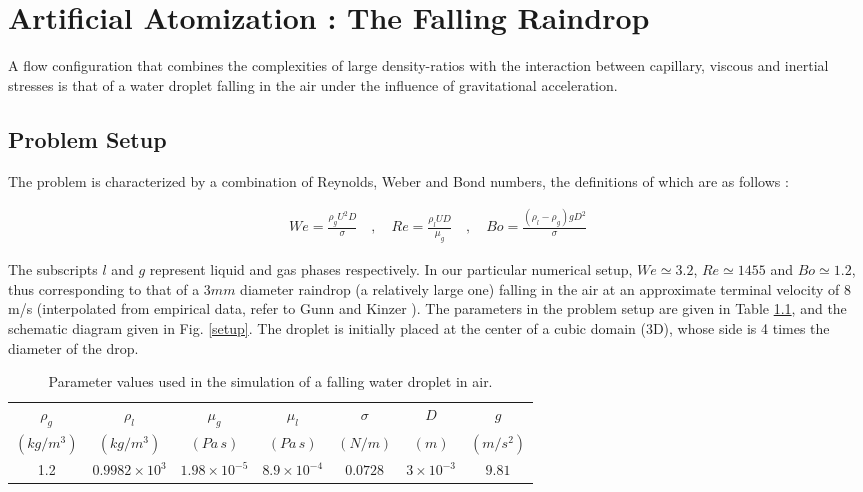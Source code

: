\setchapterpreamble[u]{\margintoc}
\chapter{Artificial Atomization : The Falling Raindrop}

A flow configuration that combines the complexities of large 
density-ratios with the interaction between capillary, viscous and 
inertial stresses is that of a water droplet falling in the 
air under the influence of gravitational acceleration. 

\section{Problem Setup}

The problem is characterized by a combination of Reynolds, 
Weber and Bond numbers, the definitions of which are as follows : 

\begin{align}
We=\frac{\rho_{g} U^2 D}{\sigma} \quad,\quad Re= \frac{\rho_{l} U D}{\mu_{g}} \quad,\quad Bo=\frac{\left(\rho_{l}-\rho_{g}\right) g D^2 }{\sigma}
\end{align}

The subscripts $l$ and $g$ represent liquid and gas phases respectively. 
In our particular numerical setup, $We \simeq 3.2 $, $Re \simeq 1455 $ and $Bo \simeq 1.2 $, 
thus corresponding to that of a $3mm$ diameter raindrop (a relatively large one) 
falling in the air at an approximate terminal velocity of  
$8$ m/s (interpolated from empirical data, refer to Gunn and Kinzer \cite{gunn1949}). 
The parameters in the problem setup are given in Table \ref{raindropprop}, 
and the schematic diagram given in Fig. \ref{setup}. 
The droplet is initially placed at the center of a cubic domain (3D), 
whose side is 4 times the diameter of the drop. 

\begin{table}[h!]
\begin{center}
\begin{tabular}{ccccccc}
\hline\hline
$\rho_{g}$ & $\rho_{l}$ & $\mu_{g}$ 
& $\mu_{l}$ & $\sigma$ & $D$ & $g$\\
$\left(kg/m^3\right)$ & $\left(kg/m^3\right)$ & $\left(Pa \, s\right)$ 
& $\left(Pa \,s \right)$ & $\left(N/m\right)$ & $(m)$ & $(m /s^{2})$ \\
\hline
1.2 & $0.9982 \times 10^3$ & $1.98 \times 10^{-5}$ & 
$8.9 \times 10^{-4}$ & $0.0728$ & $3 \times 10^{-3}$ & $9.81$\\
\hline\hline
\end{tabular}
\caption{Parameter values used in the simulation 
	of a falling water droplet in air. \label{raindropprop}}
\end{center}
\end{table}


